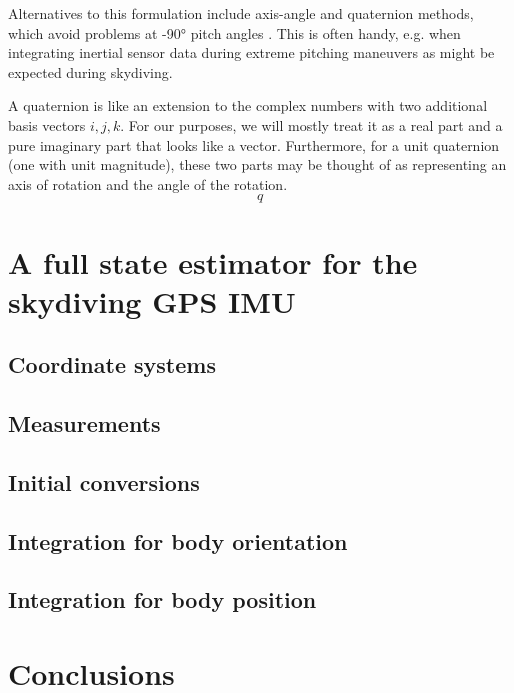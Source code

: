 \documentclass{amsart}
\begin{document}
Alternatives to this formulation include axis-angle and quaternion methods, which avoid problems at \ang{+-90} pitch angles \cite{Phillips:2004}.  This is often handy, e.g. when integrating inertial sensor data during extreme pitching maneuvers as might be expected during skydiving.

A quaternion is like an extension to the complex numbers with two additional basis vectors $i, j, k$. For our purposes, we will mostly treat it as a real part and a pure imaginary part that looks like a vector.  Furthermore, for a unit quaternion (one with unit magnitude), these two parts may be thought of as representing an axis of rotation and the angle of the rotation.  
\begin{equation}
q
\end{equation}


\section{A full state estimator for the skydiving GPS IMU}
\subsection{Coordinate systems}
\subsection{Measurements}
\subsection{Initial conversions}
\subsection{Integration for body orientation}
\subsection{Integration for body position}

\section{Conclusions}



\end{document}
